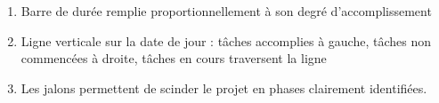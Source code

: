 \begin{enumerate}
	\item Barre de durée remplie proportionnellement à son degré d'accomplissement
	\item Ligne verticale sur la date de jour : tâches accomplies à gauche, tâches non commencées à droite, tâches en cours traversent la ligne
	\item Les jalons permettent de scinder le projet en phases clairement identifiées.
\end{enumerate}
